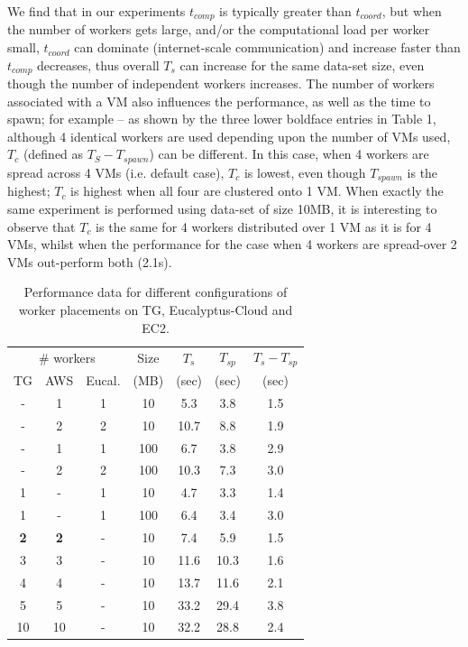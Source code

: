 \documentclass[3p,twocolumn]{elsarticle}
\begin{document}
We find that in our experiments $t_{comp}$ is typically greater than
$t_{coord}$, but when the number of workers gets large, and/or the
computational load per worker small, $t_{coord}$ can dominate
(internet-scale communication) and increase faster than $t_{comp}$
decreases, thus overall $T_s$ can increase for the same data-set size,
even though the number of independent workers increases.  The number
of workers associated with a VM also influences the performance, as
well as the time to spawn; for example -- as shown by the three lower
boldface entries in Table 1, although 4 identical workers are used
depending upon the number of VMs used, $T_c$ (defined as $T_S -
T_{spawn} $) can be different.  In this case, when 4 workers are
spread across 4 VMs (i.e. default case), $T_c$ is lowest, even though
$T_{spawn}$ is the highest; $T_c$ is highest when all four are
clustered onto 1 VM. When exactly the same experiment is performed
using data-set of size 10MB, it is interesting to observe that $T_c$
is the same for 4 workers distributed over 1 VM as it is for 4 VMs,
whilst when the performance for the case when  4 workers are
spread-over 2 VMs out-perform both (2.1s).

\begin{table}[h!]
  \footnotesize
  \begin{tabular}{ccccccc}
    \hline
    \multicolumn{3}{c}{\# workers}  &  Size   &  $T_s$  & $T_{sp}$ & $T_s - T_{sp}$\\   
    TG &  AWS & Eucal. &  (MB)  & (sec) & (sec) & (sec) \\
    \hline
    - & 1 & 1 & 10   & 5.3 & 3.8 & 1.5\\
    - & 2 & 2 & 10   & 10.7 & 8.8 & 1.9 \\
    - & 1 & 1 & 100  & 6.7 & 3.8 & 2.9\\
    - & 2 & 2 & 100  & 10.3 & 7.3 & 3.0\\
    \hline 
    1 & - & 1 & 10   & 4.7 & 3.3 & 1.4\\
    1 & - & 1 & 100  & 6.4 & 3.4 & 3.0\\
    \hline 
    {\bf 2} &   {\bf 2} & - & 10 & 7.4 & 5.9 & 1.5 \\
    3 & 3 & - & 10 & 11.6 & 10.3 & 1.6 \\
    4 & 4 & - & 10 & 13.7 & 11.6 & 2.1 \\
    5 & 5 & - & 10 & 33.2 & 29.4 & 3.8 \\ 
    10 & 10 & - & 10 & 32.2 & 28.8 & 2.4 \\
    \hline
     \hline 
  \end{tabular}
  \caption{Performance data for different configurations of worker
  placements on TG, Eucalyptus-Cloud and EC2. \uppp
  \label{tab3}}
\end{table}
\end{document}
